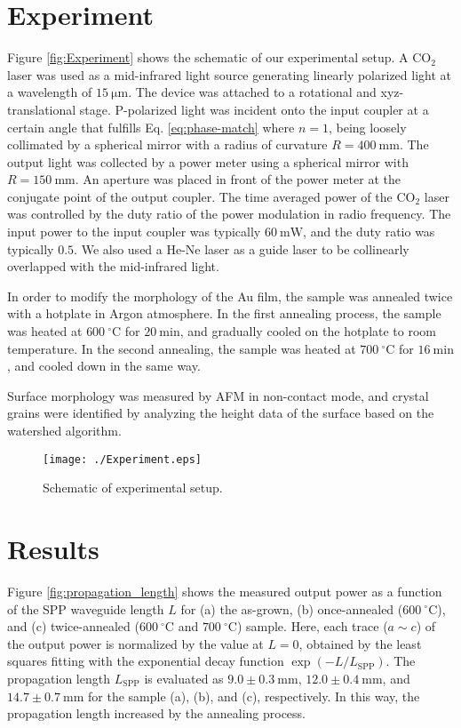 \documentclass[twocolumn,10.5pt,a4]{article}
\begin{document}
\section{Experiment}
\label{sec:experiment}
Figure \ref{fig:Experiment} shows the schematic of our experimental setup. 
A $\mathrm{CO_2}$ laser was used as a mid-infrared light source generating linearly polarized light at a wavelength of $15\:\mathrm{\mu m}$. 
The device was attached to a rotational and xyz-translational stage. 
P-polarized light was incident onto the input coupler at a certain angle that fulfills Eq. \ref{eq:phase-match} where $n=1$, being loosely collimated by a spherical mirror with a radius of curvature $R=400\:\mathrm{mm}$. 
The output light was collected by a power meter using a spherical mirror with $R=150\:\mathrm{mm}$. 
An aperture was placed in front of the power meter at the conjugate point of the output coupler. 
The time averaged power of the $\mathrm{CO_2}$ laser was controlled by the duty ratio of the power modulation in radio frequency.
The input power to the input coupler was typically $60\:\mathrm{mW}$, and the duty ratio was typically $0.5$.
We also used a He-Ne laser as a guide laser to be collinearly overlapped with the mid-infrared light. 

In order to modify the morphology of the Au film, the sample was annealed twice with a hotplate in Argon atmosphere\cite{Nogues}.
In the first annealing process, the sample was heated at $600\:^\circ\mathrm{C}$ for $20\:\mathrm{min}$, and gradually cooled on the hotplate to room temperature. In the second annealing, the sample was heated at $700\:^\circ\mathrm{C}$ for $16\:\mathrm{min}$, and cooled down in the same way.

Surface morphology was measured by AFM in non-contact mode, and crystal grains were identified by analyzing the height data of the surface based on the watershed algorithm\cite{Petr}.


 \begin{figure}[!htbp]
   \begin{center}
    \texttt{[image: ./Experiment.eps]}
    \caption{Schematic of experimental setup.}
     \label{fig:experiment}
   \end{center}
\end{figure}


\section{Results}
\label{sec:result}
Figure \ref{fig:propagation_length} shows the measured output power as a function of the SPP waveguide length $L$ for (a) the as-grown, (b) once-annealed ($600\:^\circ\mathrm{C}$), and (c) twice-annealed ($600\:^\circ\mathrm{C}$ and $700\:^\circ\mathrm{C}$) sample.
Here, each trace ($a\!\sim\!c$) of the output power is normalized by the value at $L=0$, obtained by the least squares fitting with the exponential decay function $\exp(-L/L_{\mathrm{SPP}})$. 
The propagation length $L_{\mathrm{SPP}}$ is evaluated as $9.0\pm0.3\:\mathrm{mm}$, $12.0\pm0.4\:\mathrm{mm}$, and $14.7\pm0.7\:\mathrm{mm}$ for the sample (a), (b), and (c), respectively.
In this way, the propagation length increased by the annealing process.
\end{document}
